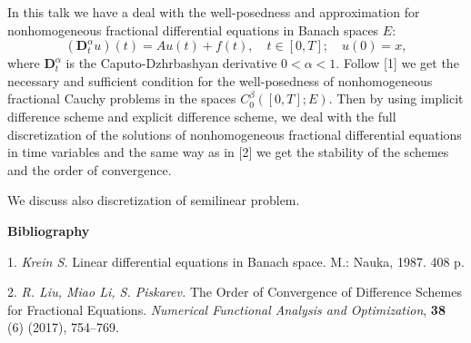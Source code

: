 
\vzmscaption

In this talk we have a deal with the well-posedness and approximation for nonhomogeneous
 fractional differential equations in Banach spaces $E$:
 $$ (\mathbf{D}_{t}^{\alpha} u)(t) = A u(t) + f (t), \quad t \in [0,T];\quad
u(0)=x, $$
where $\mathbf{D}_{t}^{\alpha}$ is the Caputo-Dzhrbashyan derivative $0 < \alpha < 1.$
Follow [1] we get the necessary and sufficient condition for the well-posedness of
nonhomogeneous fractional Cauchy problems in the spaces $C_0^\beta([0,T];E)$.
Then by using implicit difference scheme and explicit difference scheme, we
deal with the full discretization of the solutions of nonhomogeneous
fractional differential equations in time variables and the same way as in [2] we
get the stability of the schemes and the order of convergence.

We discuss also discretization of semilinear problem.


\smallskip \centerline {\bf Bibliography} \nopagebreak

1. {\it Krein S.} Linear differential equations in Banach space. M.: Nauka, 1987. 408 p.

2. {\it R. Liu, Miao Li, S. Piskarev.} The Order of Convergence of Difference Schemes for
Fractional Equations. {\em Numerical Functional Analysis and Optimization}, {\bf 38} (6)
(2017), 754--769.
